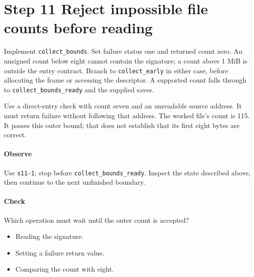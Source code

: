 \section{Step 11 Reject impossible file counts before reading}\label{png-collect-s11}
Implement \texttt{collect\_bounds}. Set failure status one and returned count zero. An unsigned count below eight cannot contain the signature; a count above 1 MiB is outside the entry contract. Branch to \texttt{collect\_early} in either case, before allocating the frame or accessing the descriptor. A supported count falls through to \texttt{collect\_bounds\_ready} and the supplied saves.

Use a direct-entry check with count seven and an unreadable source address. It must return failure without following that address. The worked file's count is 115. It passes this outer bound; that does not establish that its first eight bytes are correct.

\paragraph{Observe} Use \texttt{s11-1}; stop before \texttt{collect\_bounds\_ready}. Inspect the state described above, then continue to the next unfinished boundary.

\paragraph{Check} Which operation must wait until the outer count is accepted?
\begin{itemize}
  \item[A.] Reading the signature.
  \item[B.] Setting a failure return value.
  \item[C.] Comparing the count with eight.
\end{itemize}
